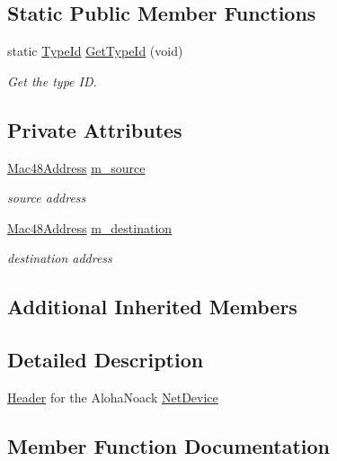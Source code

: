 \subsection*{Static Public Member Functions}
\begin{DoxyCompactItemize}
\item 
static \hyperlink{classns3_1_1TypeId}{Type\+Id} \hyperlink{classns3_1_1AlohaNoackMacHeader_a59de29dd0114a799338a6d0fcd1b6174}{Get\+Type\+Id} (void)
\begin{DoxyCompactList}\small\item\em Get the type ID. \end{DoxyCompactList}\end{DoxyCompactItemize}
\subsection*{Private Attributes}
\begin{DoxyCompactItemize}
\item 
\hyperlink{classns3_1_1Mac48Address}{Mac48\+Address} \hyperlink{classns3_1_1AlohaNoackMacHeader_a24cc1066db7e6df997f4d431196ceb90}{m\+\_\+source}
\begin{DoxyCompactList}\small\item\em source address \end{DoxyCompactList}\item 
\hyperlink{classns3_1_1Mac48Address}{Mac48\+Address} \hyperlink{classns3_1_1AlohaNoackMacHeader_ae5c6d5fbee2afc14a37cc983c215f7e3}{m\+\_\+destination}
\begin{DoxyCompactList}\small\item\em destination address \end{DoxyCompactList}\end{DoxyCompactItemize}
\subsection*{Additional Inherited Members}


\subsection{Detailed Description}
\hyperlink{classns3_1_1Header}{Header} for the Aloha\+Noack \hyperlink{classns3_1_1NetDevice}{Net\+Device} 

\subsection{Member Function Documentation}
